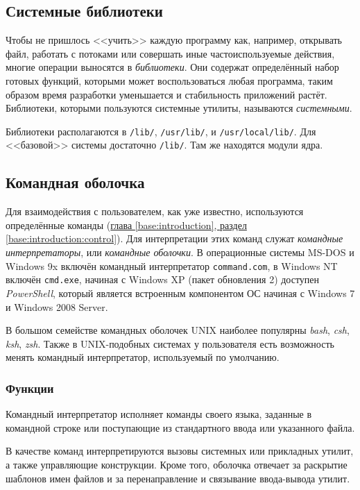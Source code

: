 \subsection{Системные библиотеки}\label{base:os:structure:libs}
Чтобы не пришлось <<учить>> каждую программу как, например, открывать файл, работать с потоками или совершать иные частоиспользуемые действия, многие операции выносятся в \emph{библиотеки}. Они содержат определённый набор готовых функций, которыми может воспользоваться любая программа, таким образом время разработки уменьшается и стабильность приложений растёт. Библиотеки, которыми пользуются системные утилиты, называются \emph{системными}.

Библиотеки располагаются в \texttt{/lib/}, \texttt{/usr/lib/}, и \texttt{/usr/local/lib/}. Для <<базовой>> системы достаточно \texttt{/lib/}. Там же находятся модули ядра.

\subsection{Командная оболочка}\label{base:os:structure:shell}
Для взаимодействия с пользователем, как уже известно, используются определённые команды (\hyperref[base:introduction:control]{глава \ref*{base:introduction}, раздел \ref*{base:introduction:control}}).
Для интерпретации этих команд служат \emph{командные интерпретаторы}, или \emph{командные оболочки}. В операционные системы MS-DOS и Windows 9x включён командный интерпретатор \texttt{command.com}, в Windows NT включён \texttt{cmd.exe}, начиная с Windows XP (пакет обновления 2) доступен \emph{PowerShell}, который является встроенным компонентом ОС начиная с Windows 7 и Windows 2008 Server.

В большом семействе командных оболочек UNIX наиболее популярны \emph{bash}, \emph{csh}, \emph{ksh}, \emph{zsh}. Также в UNIX-подобных системах у пользователя есть возможность менять командный интерпретатор, используемый по умолчанию.

\subsubsection{Функции}
Командный интерпретатор исполняет команды своего языка, заданные в командной строке или поступающие из стандартного ввода или указанного файла.

В качестве команд интерпретируются вызовы системных или прикладных утилит, а также управляющие конструкции. Кроме того, оболочка отвечает за раскрытие шаблонов имен файлов и за перенаправление и связывание ввода-вывода утилит.

